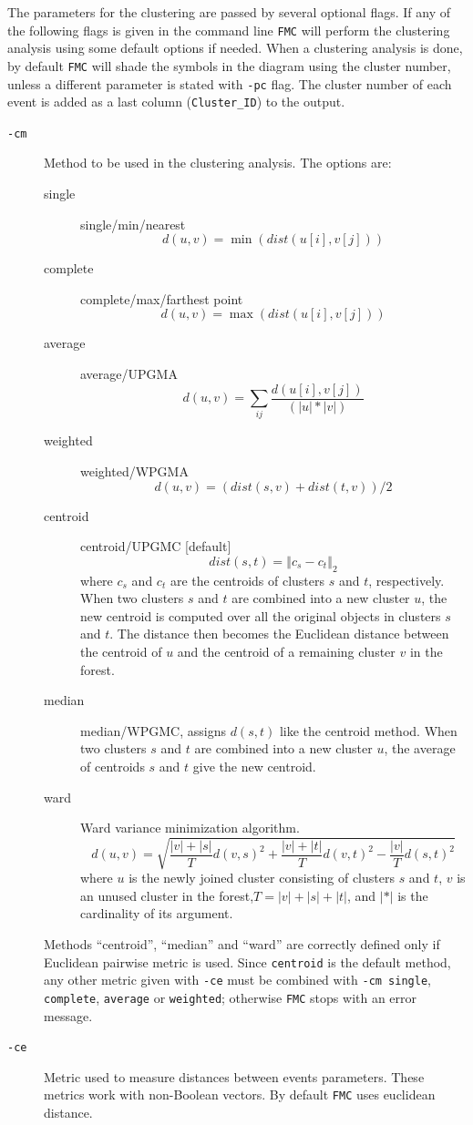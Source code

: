 \documentclass[11pt,a4paper,english]{article}
\numberwithin{equation}{section}
\begin{document}
The parameters for the clustering are passed by several optional flags.
If any of the following flags is given in the command line \texttt{FMC}
will perform the clustering analysis using some default options if
needed. When a clustering analysis is done, by default \texttt{FMC}
will shade the symbols in the diagram using the cluster number, unless
a different parameter is stated with \texttt{-pc} flag. The cluster number of each event is added as a last column (\texttt{Cluster\_ID}) to the output.
\begin{description}
\item[\texttt{-cm}] Method to be used in the clustering analysis. The
options are:

\begin{description}
\item[single] single/min/nearest 
\[
d(u,v)=\min(dist(u\left[i\right],v\left[j\right]))
\]
\item[complete] complete/max/farthest point 
\[
d(u,v)=\max(dist(u\left[i\right],v\left[j\right]))
\]
\item[average] average/UPGMA
\[
d(u,v)=\sum_{ij}\frac{d(u\left[i\right],v\left[j\right])}{(\left|u\right|*\left|v\right|)}
\]
\item[weighted] weighted/WPGMA
\[
d(u,v)=(dist(s,v)+dist(t,v))/2
\]
\item[centroid] centroid/UPGMC {[}default{]}
\[
dist(s,t)=\left\Vert c_{s}-c_{t}\right\Vert _{2}
\]
where $c_{s}$ and $c_{t}$ are the centroids of clusters $s$ and
$t$, respectively. When two clusters $s$ and $t$ are combined into
a new cluster $u$, the new centroid is computed over all the original
objects in clusters $s$ and $t$. The distance then becomes the Euclidean
distance between the centroid of $u$ and the centroid of a remaining
cluster $v$ in the forest.
\item[median] median/WPGMC, assigns $d(s,t)$ like the centroid method.
When two clusters $s$ and $t$ are combined into a new cluster $u$,
the average of centroids $s$ and $t$ give the new centroid.
\item[ward] Ward variance minimization algorithm.
\[
d(u,v)=\sqrt{\frac{\left|v\right|+\left|s\right|}{T}d(v,s)^{2}+\frac{\left|v\right|+\left|t\right|}{T}d(v,t)^{2}-\frac{\left|v\right|}{T}d(s,t)^{2}}
\]
where $u$ is the newly joined cluster consisting of clusters $s$
and $t$, $v$ is an unused cluster in the forest,$T=\left|v\right|+\left|s\right|+\left|t\right|$,
and $\left|*\right|$ is the cardinality of its argument.
\end{description}
Methods ``centroid'', ``median'' and ``ward'' are correctly
defined only if Euclidean pairwise metric is used. Since \texttt{centroid} is the default method, any other metric given with \texttt{-ce} must be combined with \texttt{-cm single}, \texttt{complete}, \texttt{average} or \texttt{weighted}; otherwise \texttt{FMC} stops with an error message.
\item[\texttt{-ce}] Metric used to measure distances between events
parameters. These metrics work with non-Boolean vectors. By default
\texttt{FMC} uses euclidean distance.


\end{description}
\end{document}
